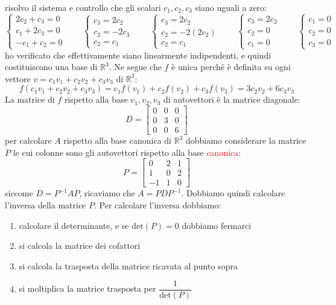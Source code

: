 \documentclass[italian]{article}
\newcommand{\ins}[1]{\text{$\mathbb{#1}$}}
\renewcommand{\det}[1]{\text{det$\left(#1\right)$}}
\begin{document}
risolvo il sistema e controllo che gli scalari $c_1,c_2,c_3$ siano uguali a zero:
\[
	\begin{cases*}
		2c_2 + c_3 = 0 \\
		c_1 +2c_3 = 0 \\
		-c_1 + c_2 = 0
	\end{cases*}
	\qquad
	\begin{cases}
		c_3 = 2c_2 \\
		c_2 = -2c_3 \\
		c_2 = c_1
	\end{cases}
	\qquad
	\begin{cases}
		c_3 = 2c_2 \\
		c_2 = -2(2c_2) \\
		c_2 = c_1
	\end{cases}
	\qquad
	\begin{cases*}
		c_3 = 2c_2 \\
		c_2 = 0 \\
		c_1 = 0
	\end{cases*}
	\qquad
	\begin{cases*}
		c_1 = 0 \\
		c_2 = 0 \\
		c_3 = 0
	\end{cases*}
\]
ho verificato che effettivamente siano linearmente indipendenti, e quindi costituiscono una base di $\ins{R}^3$. Ne segue che $f$ è unica perché è definita su ogni vettore $v=c_1v_1 + c_2v_2 + c_3v_3$ di  $\ins{R}^3$:
\[
	f(c_1v_1 + c_2v_2 + c_3v_3) = c_1f(v_1) + c_2f(v_2) + c_3f(v_3) = 3c_2v_2 + 6c_3v_3
\]
La matrice di $f$ rispetto alla base $v_1,v_2,v_3$ di autovettori è la matrice diagonale:
\[
	D = 
	\begin{bmatrix}
		0 & 0 & 0 \\
		0 & 3 & 0 \\
		0 & 0 & 6
	\end{bmatrix}
\]
per calcolare $A$ rispetto alla base canonica di $\ins{R}^3$ dobbiamo considerare la matrice $P$ le cui colonne sono gli autovettori rispetto alla base \textcolor{red}{canonica}:
\[
	P =
	\begin{bmatrix}
		0 & 2 & 1 \\
		1 & 0 & 2 \\
		-1 & 1 & 0
	\end{bmatrix}
\]	
\newpage
\noindent
siccome $D = P^{-1}AP$, ricaviamo che $A = PDP^{-1}$. Dobbiamo quindi calcolare l'inversa della matrice $P$. Per calcolare l'inversa dobbiamo:
\begin{enumerate}
	\item calcolare il determinante, e se $\det{P}=0$ dobbiamo fermarci
	\item si calcola la matrice dei cofattori 
	\item si calcola la trasposta della matrice ricavata al punto sopra
	\item si moltiplica la matrice trasposta per $\dfrac{1}{\det{P}}$
\end{enumerate}
\end{document}

